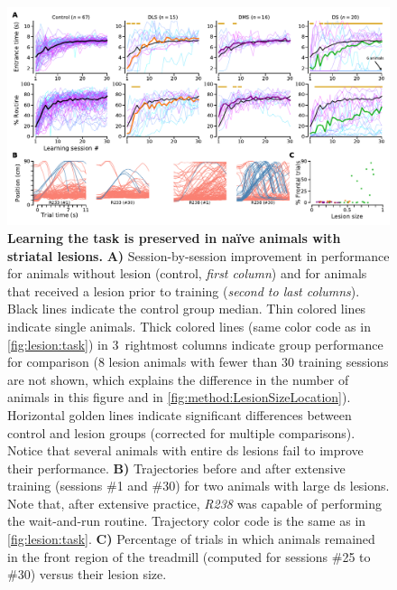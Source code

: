 \begin{figure}[bt!]
	\begin{center}
		\includegraphics[width=\textwidth]{ch-lesion/figures/EarlyLesionLearning.pdf}
		\caption[Effect of Striatal Lesions on Learning]
		{\textbf{Learning the task is preserved in na\"{i}ve animals with striatal lesions.}
		\textbf{A)}
		Session-by-session improvement in performance for animals without lesion (control, \textit{first column}) and for animals that received a lesion prior to training (\textit{second to last columns}).
		Black lines indicate the control group median.
		Thin colored lines indicate single animals.
		Thick colored lines (same color code as in \autoref{fig:lesion:task}) in 3~rightmost columns indicate group performance for comparison (8 lesion animals with fewer than 30 training sessions are not shown, which explains the difference in the number of animals in this figure and in \autoref{fig:method:LesionSizeLocation}).
		Horizontal golden lines indicate significant differences between control and lesion groups (corrected for multiple comparisons).
		Notice that several animals with entire \gls{ds} lesions fail to improve their performance.
		\textbf{B)}
		Trajectories before and after extensive training (sessions \#1 and \#30) for two animals with large \gls{ds} lesions.
		Note that, after extensive practice, \textit{R238} was capable of performing the wait-and-run routine.
		Trajectory color code is the same as in \autoref{fig:lesion:task}.
		\textbf{C)}
		Percentage of trials in which animals remained in the front region of the treadmill (computed for sessions \#25 to \#30) versus their lesion size.
		}
		\label{fig:lesion:EarlyLesionLearning}
	\end{center}
\end{figure}